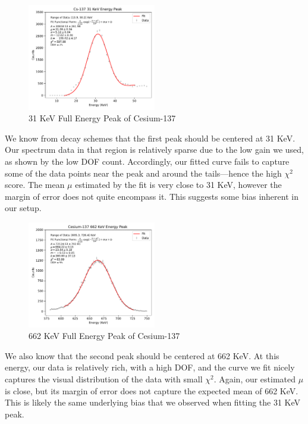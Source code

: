 \documentclass[12pt, letterpaper]{article}
\begin{document}
\begin{figure}[!h]
    \centering
    \includegraphics[width=0.5\textwidth]{experiment1/figures/cs137/peak-31.pdf}
    \caption{31 KeV Full Energy Peak of Cesium-137}
    \label{fig:cs137-31}
\end{figure}

We know from decay schemes that the first peak should be centered at 31 KeV. Our spectrum data in that region is relatively sparse due to the low gain we used, as shown by the low DOF count. Accordingly, our fitted curve fails to capture some of the data points near the peak and around the tails—hence the high $\chi^2$ score. The mean $\mu$ estimated by the fit is very close to 31 KeV, however the margin of error does not quite encompass it. This suggests some bias inherent in our setup. 

\begin{figure}[!h]
    \centering
    \includegraphics[width=0.5\textwidth]{experiment1/figures/cs137/peak-662.pdf}
    \caption{662 KeV Full Energy Peak of Cesium-137}
    \label{fig:cs137-662}
\end{figure}

We also know that the second peak should be centered at 662 KeV. At this energy, our data is relatively rich, with a high DOF, and the curve we fit nicely captures the visual distribution of the data with small $\chi^2$. Again, our estimated $\mu$ is close, but its margin of error does not capture the expected mean of 662 KeV. This is likely the same underlying bias that we observed when fitting the 31 KeV peak. 
\end{document}

